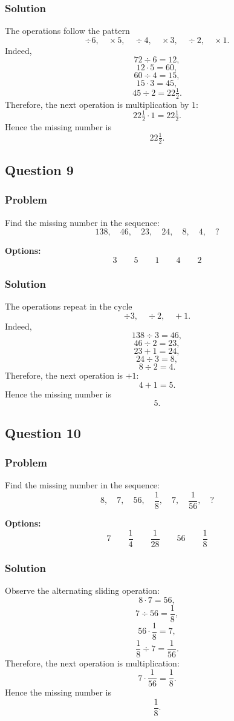 \documentclass[12pt]{article}
\begin{document}
\subsubsection{Solution}
The operations follow the pattern
\[
\div 6,\quad \times 5,\quad \div 4,\quad \times 3,\quad \div 2,\quad \times 1.
\]
Indeed,
\[
72\div 6=12,
\]
\[
12\cdot 5=60,
\]
\[
60\div 4=15,
\]
\[
15\cdot 3=45,
\]
\[
45\div 2=22\tfrac{1}{2}.
\]
Therefore, the next operation is multiplication by \(1\):
\[
22\tfrac{1}{2}\cdot 1=22\tfrac{1}{2}.
\]
Hence the missing number is
\[
\boxed{22\tfrac{1}{2}}.
\]

\subsection{Question 9}
\subsubsection{Problem}
Find the missing number in the sequence:
\[
138,\quad 46,\quad 23,\quad 24,\quad 8,\quad 4,\quad ?
\]

\noindent\textbf{Options:}
\[
\boxed{3}
\qquad
\boxed{5}
\qquad
\boxed{1}
\qquad
\boxed{4}
\qquad
\boxed{2}
\]

\subsubsection{Solution}
The operations repeat in the cycle
\[
\div 3,\quad \div 2,\quad +1.
\]
Indeed,
\[
138\div 3=46,
\]
\[
46\div 2=23,
\]
\[
23+1=24,
\]
\[
24\div 3=8,
\]
\[
8\div 2=4.
\]
Therefore, the next operation is \(+1\):
\[
4+1=5.
\]
Hence the missing number is
\[
\boxed{5}.
\]

\subsection{Question 10}
\subsubsection{Problem}
Find the missing number in the sequence:
\[
8,\quad 7,\quad 56,\quad \frac{1}{8},\quad 7,\quad \frac{1}{56},\quad ?
\]

\noindent\textbf{Options:}
\[
\boxed{7}
\qquad
\boxed{\frac{1}{4}}
\qquad
\boxed{\frac{1}{28}}
\qquad
\boxed{56}
\qquad
\boxed{\frac{1}{8}}
\]

\subsubsection{Solution}
Observe the alternating sliding operation:
\[
8\cdot 7=56,
\]
\[
7\div 56=\frac{1}{8},
\]
\[
56\cdot \frac{1}{8}=7,
\]
\[
\frac{1}{8}\div 7=\frac{1}{56}.
\]
Therefore, the next operation is multiplication:
\[
7\cdot \frac{1}{56}=\frac{1}{8}.
\]
Hence the missing number is
\[
\boxed{\frac{1}{8}}.
\]
\end{document}
